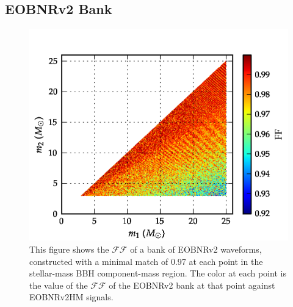 \documentclass[aps,
prd,
amsmath,
amssymb,
twocolumn,
floatfix,
groupedaddress]{revtex4-1}
\newcommand{\FF}{\mathcal{FF}}
\begin{document}
\subsection{EOBNRv2 Bank}\label{sec:level2:EffectualnessEOBNRv2}
\begin{figure}
\centering
\includegraphics[scale=0.04, clip=false, totalheight=0.3\textheight, width=\columnwidth]{EOBHMvsEOB22FULLNolines.png} %
\caption{\label{fig:match_eob22eobhm_m1m2}This figure shows the $\FF$ of a bank of EOBNRv2 waveforms, constructed with a minimal match of 0.97 at each point in the stellar-mass BBH component-mass region. The color at each point is the value of the $\FF$ of the EOBNRv2 bank at that point against EOBNRv2HM signals.}
\end{figure}
\end{document}
